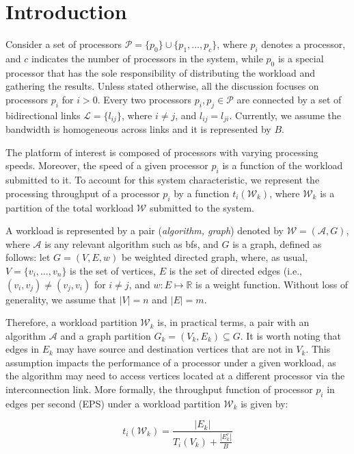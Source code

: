 \section{Introduction}
\label{sec:intro}
Consider a set of processors $\mathcal{P} = \{p_0\} \cup \{p_1,\ldots,p_c\}$, where $p_i$ denotes a processor, and $c$ indicates the number of processors in the system, while $p_0$ is a special processor that has the sole responsibility of distributing the workload and gathering the results. Unless stated otherwise, all the discussion focuses on processors $p_i$ for $i>0$. Every two processors $p_i,p_j \in \mathcal{P}$ are connected by a set of bidirectional links $\mathcal{L} = \{l_{ij}\}$, where $i \neq j$, and $l_{ij} = l_{ji}$. Currently, we assume the bandwidth is homogeneous across links and it is represented by $B$.

The platform of interest is composed of processors with varying processing speeds. Moreover, the speed of a given processor $p_i$ is a function of the workload submitted to it. To account for this system characteristic, we represent the processing throughput of a processor $p_i$ by a function $t_i(\mathcal{W}_k)$, where $\mathcal{W}_k$ is a partition of the total workload $\mathcal{W}$ submitted to the system. 

A workload is represented by a pair ({\em algorithm, graph}) denoted by $\mathcal{W} = (\mathcal{A}, G)$, where $\mathcal{A}$ is any relevant algorithm such as {\sc bfs}, and $G$ is a graph, defined as follows: let $G = (V, E, w)$ be weighted directed graph, where, as usual, $V = \{v_i, \ldots,v_n\}$ is the set of vertices, $E$ is the set of directed edges (i.e., $(v_i,v_j) \neq (v_j, v_i)$ for $i \neq j$, and $w: E \mapsto \mathbb{R}$ is a weight function. Without loss of generality, we assume that $|V| = n$ and $|E| = m$.

Therefore, a workload partition $\mathcal{W}_k$ is, in practical terms, a pair with an algorithm $\mathcal{A}$ and a graph partition $G_k = (V_k, E_k) \subseteq G$. It is worth noting that edges in $E_k$ may have source and destination vertices that are not in $V_k$. This assumption impacts the performance of a processor under a given workload, as the algorithm may need to access vertices located at a different processor via the interconnection link. More formally, the throughput function of processor $p_i$ in edges per second (EPS) under a workload partition $\mathcal{W}_k$ is given by:

\begin{equation}
t_i(\mathcal{W}_k) = \frac{|E_k|}{T_i(V_k) + \frac{|E_k^{r}|}{B}}
\end{equation}\label{eq:throughput_p}


